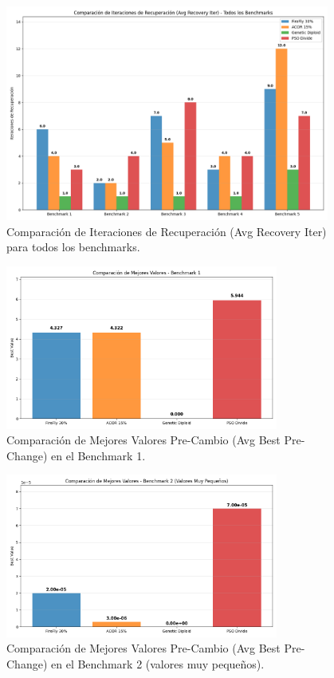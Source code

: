 \documentclass[10pt]{article}
\begin{document}
\begin{figure}[H]
    \centering
    \includegraphics[width=0.95\textwidth]{imagenes/iteraciones.png}
    \caption{Comparación de Iteraciones de Recuperación (Avg Recovery Iter) para todos los benchmarks.}
    \label{fig:recuperacion}
\end{figure}

\begin{figure}[H]
    \centering
    \includegraphics[width=0.8\textwidth]{imagenes/b1.png}
    \caption{Comparación de Mejores Valores Pre-Cambio (Avg Best Pre-Change) en el Benchmark 1.}
    \label{fig:b1}
\end{figure}

\begin{figure}[H]
    \centering
    \includegraphics[width=0.8\textwidth]{imagenes/b2.png}
    \caption{Comparación de Mejores Valores Pre-Cambio (Avg Best Pre-Change) en el Benchmark 2 (valores muy pequeños).}
    \label{fig:b2}
\end{figure}
\end{document}
